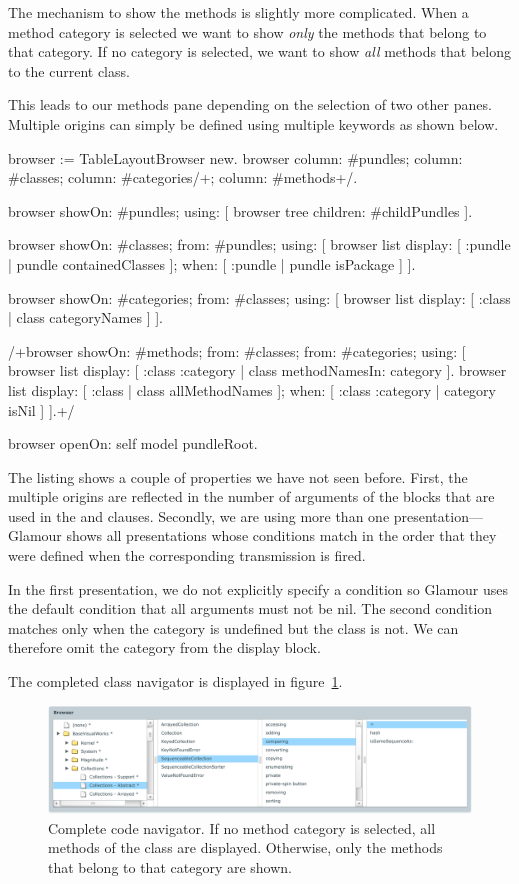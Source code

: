 \documentclass[a4paper,10pt,twoside]{book}
\begin{document}
The mechanism to show the methods is slightly more complicated. When a method category is selected we want to show \emph{only} the methods that belong to that category. If no category is selected, we want to show \emph{all} methods that belong to the current class.

This leads to our methods pane depending on the selection of two other panes. Multiple origins can simply be defined using multiple  keywords as shown below.

\begin{code}{}
browser := TableLayoutBrowser new.
browser
	column: #pundles;
	column: #classes;
	column: #categories/+;
	column: #methods+/.

browser showOn: #pundles; using: [
	browser tree
		children: #childPundles
].

browser showOn: #classes; from: #pundles; using: [
	browser list
		display: [ :pundle | pundle containedClasses ];
		when: [ :pundle | pundle isPackage ]
].

browser showOn: #categories; from: #classes; using: [
	browser list
		display: [ :class | class categoryNames ]
].

/+browser showOn: #methods; from: #classes; from: #categories; using: [
	browser list
		display: [ :class :category | class methodNamesIn: category ].
	browser list
		display: [ :class | class allMethodNames ];
		when: [ :class :category | category isNil ]
].+/

browser openOn: self model pundleRoot.
\end{code}

The listing shows a couple of properties we have not seen
before. First, the multiple origins are reflected in the number of
arguments of the blocks that are used in the  and
 clauses. Secondly, we are using more than one
presentation---Glamour shows all presentations whose conditions match in
the order that they were defined when the corresponding transmission
is fired.

In the first presentation, we do not explicitly specify a condition so Glamour uses the default condition that all arguments must not be nil. The second condition matches only when the category is undefined but the class is not. We can therefore omit the category from the display block.

The completed class navigator is displayed in figure~\ref{fig:codenavigator}.

\begin{figure}[htbp]
\centerline{\includegraphics[width=\linewidth]{codenavigator.pdf}}
\caption{Complete code navigator. If no method category is selected, all methods of the class
are displayed. Otherwise, only the methods that belong to that category are shown.}
\label{fig:codenavigator}
\end{figure}
\end{document}
